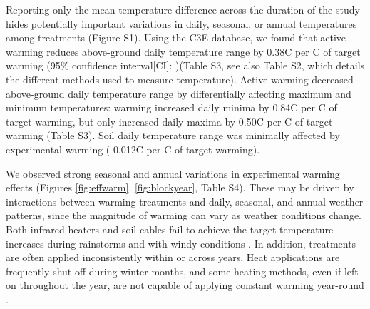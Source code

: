 \documentclass{article}
\begin{document}
Reporting only the mean temperature difference across the duration of the study hides potentially important variations in daily, seasonal, or annual temperatures among treatments (Figure S1). Using the C3E database, we found that active warming reduces above-ground daily temperature range by 0.38\degree C per \degree C of target warming (95\% confidence interval[CI]: )(Table S3, see also Table S2, which details the different methods used to measure temperature). Active warming decreased above-ground daily temperature range by differentially affecting maximum and minimum temperatures: warming increased daily minima by 0.84\degree C per \degree C of target warming, but only increased daily maxima by 0.50\degree C per \degree C of target warming (Table S3). Soil daily temperature range was minimally affected by experimental warming (-0.012\degree C per \degree C of target warming).%


\par We observed strong seasonal and annual variations in experimental warming effects (Figures \ref{fig:effwarm}, \ref{fig:blockyear}, Table S4). %
These may be driven by interactions between warming treatments and daily, seasonal, and annual weather patterns, since the magnitude of warming can vary as weather conditions change.  Both infrared heaters and soil cables fail to achieve the target temperature increases during rainstorms \citep{peterjohn1993,hoeppner2012} and with windy conditions \citep{kimball2005,kimball2008}. In addition, treatments are often applied inconsistently within or across years. Heat applications are frequently shut off during winter months, and some heating methods, even if left on throughout the year, are not capable of applying constant warming year-round \citep[e.g.][]{clark2014a,clark2014b,hagedorn2010}. %
\end{document}
